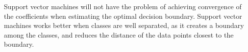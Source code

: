 \begin{answer}

Support vector machines will not have the problem of achieving convergence of the coefficients when estimating the optimal decision boundary. Support vector machines works better when classes are well separated, as it creates a boundary among the classes, and reduces the distance of the data points closest to the boundary. 

\end{answer}
